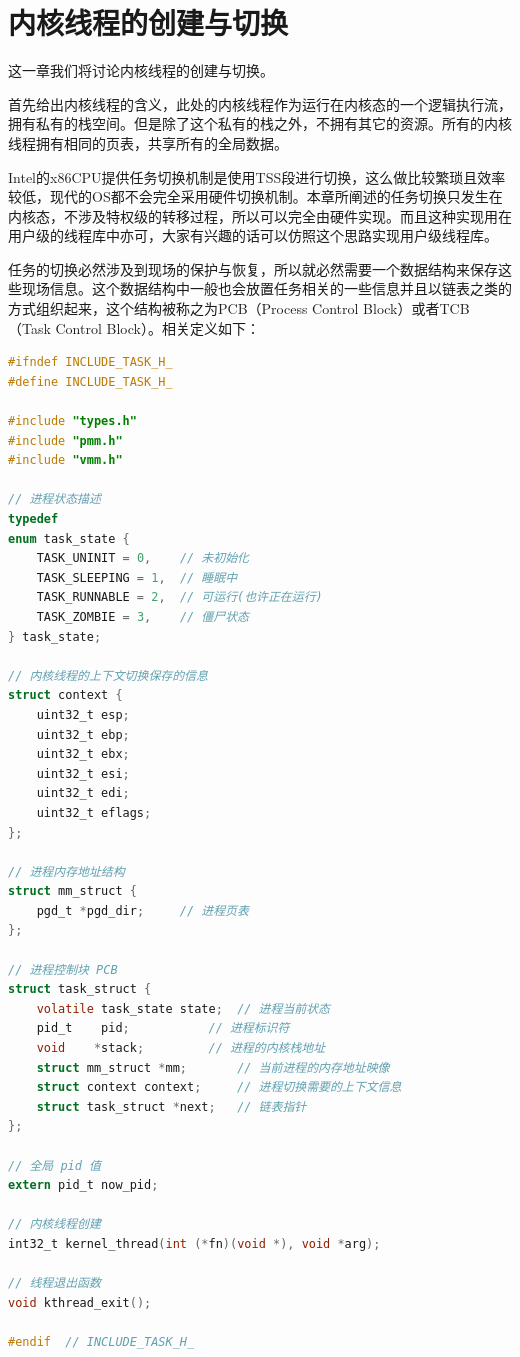 
\section {内核线程的创建与切换}

\par 这一章我们将讨论内核线程的创建与切换。

\par 首先给出内核线程的含义，此处的内核线程作为运行在内核态的一个逻辑执行流，拥有私有的栈空间。但是除了这个私有的栈之外，不拥有其它的资源。所有的内核线程拥有相同的页表，共享所有的全局数据。

\par Intel的x86CPU提供任务切换机制是使用TSS段进行切换，这么做比较繁琐且效率较低，现代的OS都不会完全采用硬件切换机制。本章所阐述的任务切换只发生在内核态，不涉及特权级的转移过程，所以可以完全由硬件实现。而且这种实现用在用户级的线程库中亦可，大家有兴趣的话可以仿照这个思路实现用户级线程库。

\par 任务的切换必然涉及到现场的保护与恢复，所以就必然需要一个数据结构来保存这些现场信息。这个数据结构中一般也会放置任务相关的一些信息并且以链表之类的方式组织起来，这个结构被称之为PCB（Process Control Block）或者TCB（Task Control Block）。相关定义如下：

\begin{lstlisting}[language = C, caption = include/task.h]
#ifndef INCLUDE_TASK_H_
#define INCLUDE_TASK_H_

#include "types.h"
#include "pmm.h"
#include "vmm.h"

// 进程状态描述
typedef
enum task_state {
	TASK_UNINIT = 0, 	// 未初始化
	TASK_SLEEPING = 1, 	// 睡眠中
	TASK_RUNNABLE = 2, 	// 可运行(也许正在运行)
	TASK_ZOMBIE = 3, 	// 僵尸状态
} task_state;

// 内核线程的上下文切换保存的信息
struct context {
	uint32_t esp;
	uint32_t ebp;
	uint32_t ebx;
	uint32_t esi;
	uint32_t edi;
	uint32_t eflags;
};

// 进程内存地址结构
struct mm_struct {
	pgd_t *pgd_dir; 	// 进程页表
};

// 进程控制块 PCB 
struct task_struct {
	volatile task_state state; 	// 进程当前状态
	pid_t 	 pid; 			// 进程标识符
	void  	*stack; 		// 进程的内核栈地址
	struct mm_struct *mm; 		// 当前进程的内存地址映像
	struct context context; 	// 进程切换需要的上下文信息
	struct task_struct *next; 	// 链表指针
};

// 全局 pid 值
extern pid_t now_pid;

// 内核线程创建
int32_t kernel_thread(int (*fn)(void *), void *arg);

// 线程退出函数
void kthread_exit();

#endif 	// INCLUDE_TASK_H_
\end{lstlisting}

